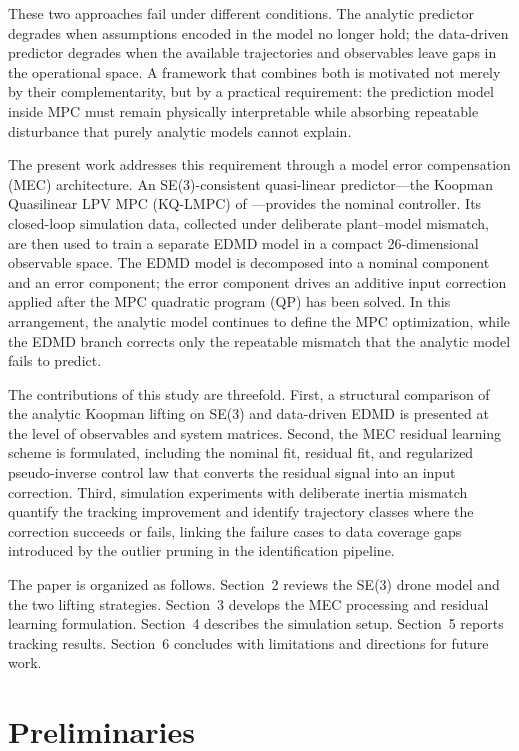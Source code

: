 \documentclass{article}
\begin{document}
These two approaches fail under different conditions. The analytic predictor degrades when assumptions encoded in the model no longer hold; the data-driven predictor degrades when the available trajectories and observables leave gaps in the operational space. A framework that combines both is motivated not merely by their complementarity, but by a practical requirement: the prediction model inside MPC must remain physically interpretable while absorbing repeatable disturbance that purely analytic models cannot explain.

The present work addresses this requirement through a model error compensation (MEC) architecture. An SE(3)-consistent quasi-linear predictor---the Koopman Quasilinear LPV MPC (KQ-LMPC) of \cite{rajkumar2025}---provides the nominal controller. Its closed-loop simulation data, collected under deliberate plant--model mismatch, are then used to train a separate EDMD model in a compact 26-dimensional observable space. The EDMD model is decomposed into a nominal component and an error component; the error component drives an additive input correction applied after the MPC quadratic program (QP) has been solved. In this arrangement, the analytic model continues to define the MPC optimization, while the EDMD branch corrects only the repeatable mismatch that the analytic model fails to predict.

The contributions of this study are threefold. First, a structural comparison of the analytic Koopman lifting on SE(3) and data-driven EDMD is presented at the level of observables and system matrices. Second, the MEC residual learning scheme is formulated, including the nominal fit, residual fit, and regularized pseudo-inverse control law that converts the residual signal into an input correction. Third, simulation experiments with deliberate inertia mismatch quantify the tracking improvement and identify trajectory classes where the correction succeeds or fails, linking the failure cases to data coverage gaps introduced by the outlier pruning in the identification pipeline.

The paper is organized as follows. Section~2 reviews the SE(3) drone model and the two lifting strategies. Section~3 develops the MEC processing and residual learning formulation. Section~4 describes the simulation setup. Section~5 reports tracking results. Section~6 concludes with limitations and directions for future work.

\section{Preliminaries}
\end{document}
